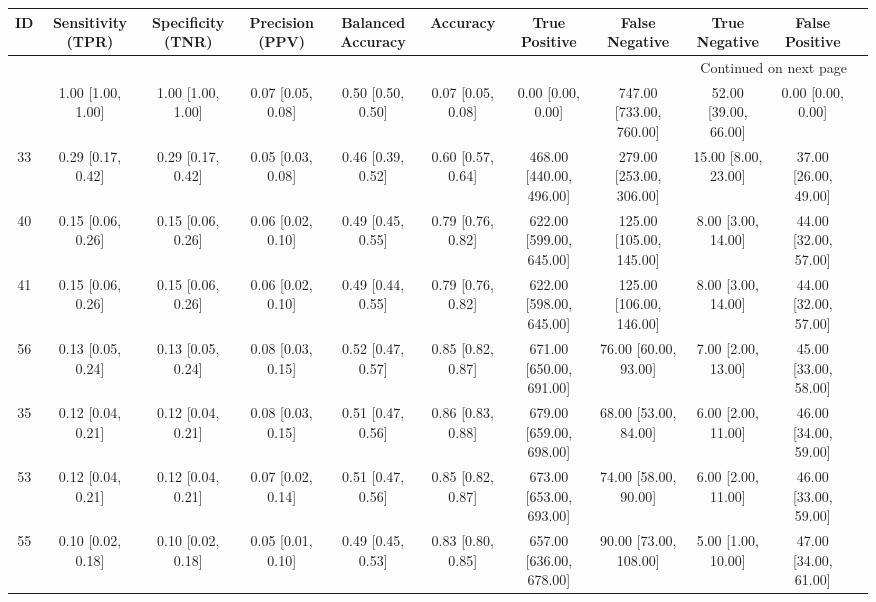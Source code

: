 \documentclass[8pt]{article}
\begin{document}
\begin{center}
\begin{footnotesize}
\begin{longtable}{|ccccccccccc|}
\toprule
 ID &  Sensitivity (TPR) &  Specificity (TNR) &    Precision (PPV) &  Balanced Accuracy &           Accuracy &            True Positive &           False Negative &         True Negative &        False Positive \\
\midrule
\endhead
\midrule
\multicolumn{10}{r}{{Continued on next page}} \\
\midrule
\endfoot

\bottomrule
\endlastfoot
 42 &  1.00 [1.00, 1.00] &  1.00 [1.00, 1.00] &  0.07 [0.05, 0.08] &  0.50 [0.50, 0.50] &  0.07 [0.05, 0.08] &        0.00 [0.00, 0.00] &  747.00 [733.00, 760.00] &  52.00 [39.00, 66.00] &     0.00 [0.00, 0.00] \\
 33 &  0.29 [0.17, 0.42] &  0.29 [0.17, 0.42] &  0.05 [0.03, 0.08] &  0.46 [0.39, 0.52] &  0.60 [0.57, 0.64] &  468.00 [440.00, 496.00] &  279.00 [253.00, 306.00] &   15.00 [8.00, 23.00] &  37.00 [26.00, 49.00] \\
 40 &  0.15 [0.06, 0.26] &  0.15 [0.06, 0.26] &  0.06 [0.02, 0.10] &  0.49 [0.45, 0.55] &  0.79 [0.76, 0.82] &  622.00 [599.00, 645.00] &  125.00 [105.00, 145.00] &    8.00 [3.00, 14.00] &  44.00 [32.00, 57.00] \\
 41 &  0.15 [0.06, 0.26] &  0.15 [0.06, 0.26] &  0.06 [0.02, 0.10] &  0.49 [0.44, 0.55] &  0.79 [0.76, 0.82] &  622.00 [598.00, 645.00] &  125.00 [106.00, 146.00] &    8.00 [3.00, 14.00] &  44.00 [32.00, 57.00] \\
 56 &  0.13 [0.05, 0.24] &  0.13 [0.05, 0.24] &  0.08 [0.03, 0.15] &  0.52 [0.47, 0.57] &  0.85 [0.82, 0.87] &  671.00 [650.00, 691.00] &     76.00 [60.00, 93.00] &    7.00 [2.00, 13.00] &  45.00 [33.00, 58.00] \\
 35 &  0.12 [0.04, 0.21] &  0.12 [0.04, 0.21] &  0.08 [0.03, 0.15] &  0.51 [0.47, 0.56] &  0.86 [0.83, 0.88] &  679.00 [659.00, 698.00] &     68.00 [53.00, 84.00] &    6.00 [2.00, 11.00] &  46.00 [34.00, 59.00] \\
 53 &  0.12 [0.04, 0.21] &  0.12 [0.04, 0.21] &  0.07 [0.02, 0.14] &  0.51 [0.47, 0.56] &  0.85 [0.82, 0.87] &  673.00 [653.00, 693.00] &     74.00 [58.00, 90.00] &    6.00 [2.00, 11.00] &  46.00 [33.00, 59.00] \\
 55 &  0.10 [0.02, 0.18] &  0.10 [0.02, 0.18] &  0.05 [0.01, 0.10] &  0.49 [0.45, 0.53] &  0.83 [0.80, 0.85] &  657.00 [636.00, 678.00] &    90.00 [73.00, 108.00] &    5.00 [1.00, 10.00] &  47.00 [34.00, 61.00] \\

\end{longtable}
\end{footnotesize}
\end{center}
\end{document}
